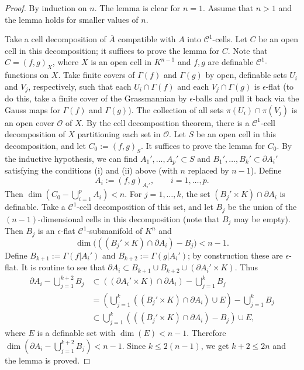 \documentclass[a4paper, 12pt, final]{article}
\newtheorem{open problem}[lem]{Open problem}
\theoremstyle{remark}
\theoremstyle{definition}
\newtheorem{final remark}[lem]{Final remark}
\begin{document}
\begin{proof}By induction on $n$. The lemma is clear for $n=1$. Assume that $n>1$ and the  lemma holds for smaller values of $n$. 

Take a cell decomposition of  ${\overline{A}}$ compatible with $A$ into ${\mathcal C^1}$-cells. 
Let $C$ be an open
cell in this decomposition; it suffices to prove the lemma for $C$. Note that
$C=(f,g)_X$, where $X$ is an open cell in ${K}^{n-1}$ and $f,g$ are definable
${\mathcal C^1}$-functions on $X$. Take finite covers of $\Gamma(f)$ and $\Gamma(g)$ by
open, definable sets $U_i$ and $V_j$, respectively, such that each
$U_i\cap\Gamma(f)$ and each $V_j\cap\Gamma(g)$ is $\epsilon$-flat (to do this,
take a finite cover of the Grassmannian by $\epsilon$-balls and pull it back
via the Gauss maps for $\Gamma(f)$ and $\Gamma(g)$). The collection of all
sets $\pi(U_i)\cap\pi(V_j)$ is an open cover $\mathcal{O}$ of $X$. By the cell
decomposition theorem, there is  a ${\mathcal C^1}$-cell decomposition of $X$
partitioning each set in $\mathcal{O}$. Let $S$ be an open cell in this
decomposition, and let $C_0:=(f,g)_S$. It suffices to prove the lemma for
$C_0$.  By the inductive hypothesis, we can find $A_1',\dots,A_p'\subset S$
and $B_1',\dots,B_k'\subset\partial A_i'$ satisfying the conditions (i) and
(ii) above (with $n$ replaced by $n-1$). Define
\[
A_i:=(f,g)_{A_i'},\qquad i=1,\dots,p.
\]
Then $\dim(C_0-\bigcup_{i=1}^pA_i)<n$. 
For $j=1,\dots,k$, the set $(B_j'\times{K})\cap\partial A_i$ is definable. Take
a ${\mathcal C^1}$-cell decomposition of this set, and let $B_j$ be the union of the
$(n-1)$-dimensional cells in this decomposition (note that $B_j$ may be
empty). Then $B_j$ is an $\epsilon$-flat ${\mathcal C^1}$-submanifold of ${K}^n$ and
\[
\dim{\bigl( {((B_j'\times{K})\cap\partial A_i)-B_j} \bigr)}<n-1.
\]
Define $B_{k+1}:=\Gamma(f\big| A_i')$ and $B_{k+2}:=\Gamma(g\big| A_i')$; by construction these are $\epsilon$-flat.
It is routine to see that $\partial A_i\subset B_{k+1}\cup B_{k+2}\cup(\partial A_i'\times{K})$.
Thus
\begin{align*}
\partial A_i-{\textstyle\bigcup}_{j=1}^{k+2}B_j & \subset((\partial
A_i'\times{K})\cap\partial A_i)- {\textstyle\bigcup}_{j=1}^kB_j\\
&=({\textstyle\bigcup}_{j=1}^k((B_j'\times{K})\cap\partial A_i)\cup E)-{\textstyle\bigcup}_{j=1}^kB_j\\
&\subset{\textstyle\bigcup}_{j=1}^k(((B_j'\times{K})\cap\partial A_i)-B_j)\cup E,
\end{align*}
where $E$ is a definable set with $\dim(E)<n-1$. 
Therefore $\dim(\partial A_i-\bigcup_{j=1}^{k+2}B_j)<n-1$.
Since $k\leq 2 (n-1)$, we get $k+2\leq 2 n$ and the lemma is proved.
\end{proof}
\end{document}
